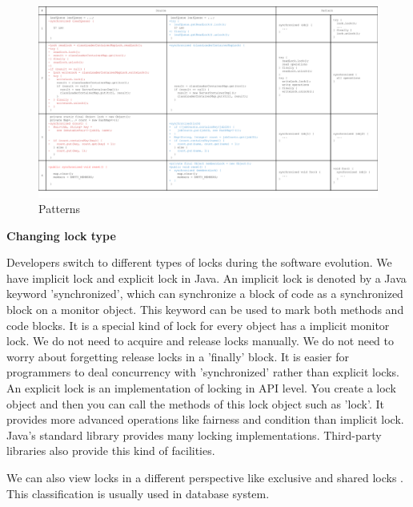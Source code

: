 \begin{figure}
	\centering
	\includegraphics[width=1\textwidth]{patterns}
	\caption{Patterns}
\end{figure}

\textbf{Changing lock type}

Developers switch to different types of locks during the software evolution. We have implicit lock and explicit lock in Java. An implicit lock is denoted by a Java keyword 'synchronized', which can synchronize a block of code as a synchronized block on a monitor object. This keyword can be used to mark both methods and code blocks. It is a special kind of lock for every object has a implicit monitor lock. We do not need to acquire and release locks manually. We do not need to worry about forgetting release locks in a 'finally' block. It is easier for programmers to deal concurrency with 'synchronized' rather than explicit locks. An explicit lock is an implementation of locking in API level. You create a lock object and then you can call the methods of this lock object such as 'lock'. It provides more advanced operations like fairness and condition than implicit lock. Java's standard library provides many locking implementations. Third-party libraries also provide this kind of facilities.

We can also view locks in a different perspective like exclusive and shared locks \cite{journals/jacm/KedemS83}. This classification is usually used in database system.


